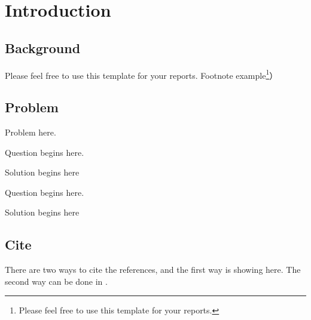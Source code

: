 
\chapter{Introduction}

\section{Background}

Please feel free to use this template for your reports.
Footnote example\footnote{Please feel free to use this template for your reports.}）



\section{Problem}

Problem here.

\begin{problem}{1}
    Question begins here.
\end{problem}

\begin{solution}
    Solution begins here
\end{solution}

\begin{problem}{2}
    Question begins here.
\end{problem}

\begin{solution}
    Solution begins here
\end{solution}






\section{Cite}

There are two ways to cite the references, and the first way \citep{nakano1923notes,honda1957mechanism} is showing here. 
The second way can be done in \cite{honda1957mechanism}.



\clearpage